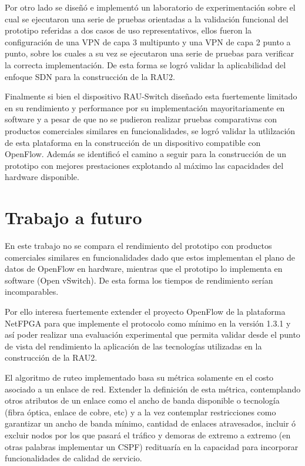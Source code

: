 Por otro lado se diseñ\'o e implement\'o un laboratorio de experimentaci\'on sobre el cual se ejecutaron una serie de pruebas orientadas a la validaci\'on funcional del prototipo referidas a dos casos de uso representativos, ellos fueron la configuración de una VPN de capa 3 multipunto y una VPN de capa 2 punto a punto, sobre los cuales a su vez se ejecutaron una serie de pruebas para verificar la correcta implementaci\'on. De esta forma se logr\'o validar la aplicabilidad del enfoque SDN para la construcci\'on de la RAU2.

Finalmente si bien el dispositivo RAU-Switch diseñado esta fuertemente limitado en su rendimiento y performance por su implementaci\'on mayoritariamente en software y a pesar de que no se pudieron realizar pruebas comparativas con productos comerciales similares en funcionalidades, se logr\'o validar la utlilzaci\'on de esta plataforma en la construcci\'on de un dispositivo compatible con OpenFlow. Adem\'as se identific\'o el camino a seguir para la construcci\'on de un prototipo con mejores prestaciones explotando al m\'aximo las capacidades del hardware disponible.  

\section{Trabajo a futuro}
En este trabajo no se compara el rendimiento del prototipo con productos comerciales similares en funcionalidades dado que estos implementan el plano de datos de OpenFlow en hardware, mientras que el prototipo lo implementa en software (Open vSwitch). De esta forma los tiempos de rendimiento ser\'ian incomparables.

Por ello interesa fuertemente extender el proyecto OpenFlow de la plataforma NetFPGA para que implemente el protocolo como mínimo en la versi\'on 1.3.1 y as\'i poder realizar una evaluaci\'on experimental que permita validar desde el punto de vista del rendimiento la aplicaci\'on de las tecnolog\'ias utilizadas en la construcci\'on de la RAU2.

El algoritmo de ruteo implementado basa su m\'etrica solamente en el costo asociado a un enlace de red. Extender la definici\'on de esta m\'etrica, contemplando otros atributos de un enlace como el ancho de banda disponible o tecnolog\'ia (fibra \'optica, enlace de cobre, etc) y a la vez contemplar restricciones como garantizar un ancho de banda m\'inimo, cantidad de enlaces atravesados, incluir \'o excluir nodos por los que pasar\'a el tr\'afico y demoras de extremo a extremo (en otras palabras implementar un CSPF) redituaría en la capacidad para incorporar funcionalidades de calidad de servicio.

